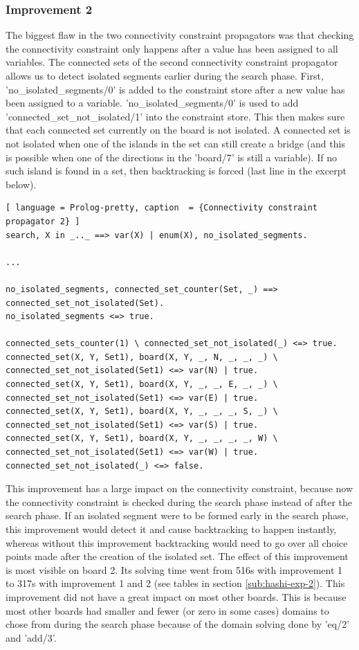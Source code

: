 \documentclass{report}
\begin{document}
\subsubsection{Improvement 2}
\label{sec:improvement2}
The biggest flaw in the two connectivity constraint propagators was that checking the connectivity constraint only happens after a value has been assigned to all variables. The connected sets of the second connectivity constraint propagator allows us to detect isolated segments earlier during the search phase. First,  'no\_isolated\_segments/0' is added to the constraint store after a new value has been assigned to a variable. 'no\_isolated\_segments/0' is used to add 'connected\_set\_not\_isolated/1' into the constraint store. This then makes sure that each connected set currently on the board is not isolated. A connected set is not isolated when one of the islands in the set can still create a bridge (and this is possible when one of the directions in the 'board/7' is still a variable). If no such island is found in a set, then backtracking is forced (last line in the excerpt below).

\begin{lstlisting}[ language = Prolog-pretty, caption  = {Connectivity constraint propagator 2} ]
search, X in _.._ ==> var(X) | enum(X), no_isolated_segments.

...

no_isolated_segments, connected_set_counter(Set, _) ==> connected_set_not_isolated(Set).
no_isolated_segments <=> true.

connected_sets_counter(1) \ connected_set_not_isolated(_) <=> true.
connected_set(X, Y, Set1), board(X, Y, _, N, _, _, _) \ connected_set_not_isolated(Set1) <=> var(N) | true.
connected_set(X, Y, Set1), board(X, Y, _, _, E, _, _) \ connected_set_not_isolated(Set1) <=> var(E) | true.
connected_set(X, Y, Set1), board(X, Y, _, _, _, S, _) \ connected_set_not_isolated(Set1) <=> var(S) | true.
connected_set(X, Y, Set1), board(X, Y, _, _, _, _, W) \ connected_set_not_isolated(Set1) <=> var(W) | true.
connected_set_not_isolated(_) <=> false.
\end{lstlisting}

This improvement has a large impact on the connectivity constraint, because now the connectivity constraint is checked during the search phase instead of after the search phase. If an isolated segment were to be formed early in the search phase, this improvement would detect it and cause backtracking to happen instantly, whereas without this improvement backtracking would need to go over all choice points made after the creation of the isolated set. The effect of this improvement is most visible on board 2. Its solving time went from 516s with improvement 1 to 317s with improvement 1 and 2 (see tables in section \ref{sub:hashi-exp-2}). This improvement did not have a great impact on most other boards. This is because most other boards had smaller and fewer (or zero in some cases) domains to chose from during the search phase because of the domain solving done by 'eq/2' and 'add/3'.
\end{document}
